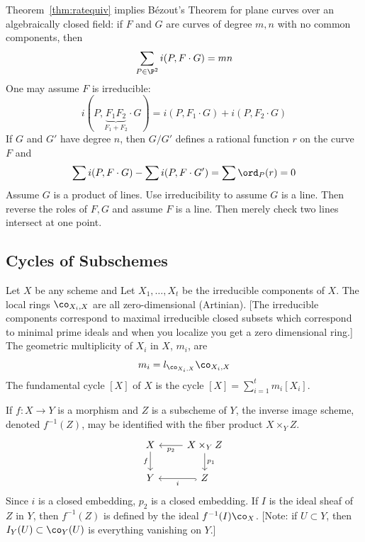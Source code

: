 \begin{ex}
Theorem~\ref{thm:ratequiv} implies B\'ezout's Theorem for plane curves over an algebraically closed field: if $F$ and $G$ are curves of degree $m,n$ with no common components, then
	\[
	\sum_{P \in \P^2} i(P,F \cdot G) = mn
	\]
One may assume $F$ is irreducible:
	\[
	i(P,\underbrace{F_1F_2}_{F_1+F_2} \cdot G)=i(P,F_1 \cdot G)+i(P, F_2 \cdot G)
	\]
If $G$ and $G'$ have degree $n$, then $G/G'$ defines a rational function $r$ on the curve $F$ and 
	\[
	\sum i(P,F \cdot G) - \sum i(P,F \cdot G') = \sum \ord_P(r) = 0 
	\]
Assume $G$ is a product of lines. Use irreducibility to assume $G$ is a line. Then reverse the roles of $F,G$ and assume $F$ is a line. Then merely check two lines intersect at one point. 
\end{ex}


\subsection{Cycles of Subschemes}

Let $X$ be any scheme and Let $X_1,\ldots,X_t$ be the irreducible components of $X$. The local rings $\co_{X_i,X}$ are all zero-dimensional (Artinian). [The irreducible components correspond to maximal irreducible closed subsets which correspond to minimal prime ideals and when you localize you get a zero dimensional ring.] The geometric multiplicity of $X_i$ in $X$, $m_i$, are
	\[
	m_i= l_{\co_{X_i,X}} \co_{X_i,X}
	\]
The fundamental cycle $[X]$ of $X$ is the cycle $[X]=\sum_{i=1}^t m_i [X_i]$.

\begin{dfn}
If $f: X \to Y$ is a morphism and $Z$ is a subscheme of $Y$, the inverse image scheme, denoted $f^{-1}(Z)$, may be identified with the fiber product $X \times_Y Z$. 
	\[
	\begin{tikzcd}
	X \arrow[swap]{d}{f} & X \times_Y Z \arrow{l}{p_2} \arrow{d}{p_1} \\
	Y & Z \arrow[hook]{l}{i}
	\end{tikzcd}
	\]
Since $i$ is a closed embedding, $p_2$ is a closed embedding. If $I$ is the ideal sheaf of $Z$ in $Y$, then $f^{-1}(Z)$ is defined by the ideal $f^{-1}(I) \co_X$. [Note: if $U \subset Y$, then $I_Y(U) \subset \co_Y(U)$ is everything vanishing on $Y$.]
\end{dfn}

